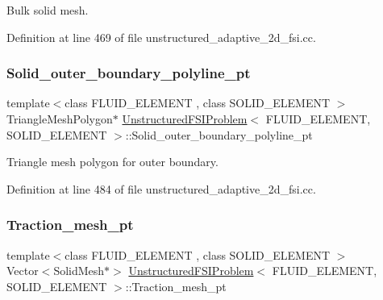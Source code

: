 Bulk solid mesh. 



Definition at line 469 of file unstructured\+\_\+adaptive\+\_\+2d\+\_\+fsi.\+cc.

\mbox{\label{classUnstructuredFSIProblem_afae1de4c7e087e2ba4f60f4f7632674b}} 
\subsubsection{\texorpdfstring{Solid\+\_\+outer\+\_\+boundary\+\_\+polyline\+\_\+pt}{Solid\_outer\_boundary\_polyline\_pt}}
{\footnotesize\ttfamily template$<$class F\+L\+U\+I\+D\+\_\+\+E\+L\+E\+M\+E\+NT , class S\+O\+L\+I\+D\+\_\+\+E\+L\+E\+M\+E\+NT $>$ \\
Triangle\+Mesh\+Polygon$\ast$ \hyperlink{classUnstructuredFSIProblem}{Unstructured\+F\+S\+I\+Problem}$<$ F\+L\+U\+I\+D\+\_\+\+E\+L\+E\+M\+E\+NT, S\+O\+L\+I\+D\+\_\+\+E\+L\+E\+M\+E\+NT $>$\+::Solid\+\_\+outer\+\_\+boundary\+\_\+polyline\+\_\+pt\hspace{0.3cm}{\ttfamily [private]}}



Triangle mesh polygon for outer boundary. 



Definition at line 484 of file unstructured\+\_\+adaptive\+\_\+2d\+\_\+fsi.\+cc.

\mbox{\label{classUnstructuredFSIProblem_ab722df0380d0c045f093472173340fa1}} 
\subsubsection{\texorpdfstring{Traction\+\_\+mesh\+\_\+pt}{Traction\_mesh\_pt}}
{\footnotesize\ttfamily template$<$class F\+L\+U\+I\+D\+\_\+\+E\+L\+E\+M\+E\+NT , class S\+O\+L\+I\+D\+\_\+\+E\+L\+E\+M\+E\+NT $>$ \\
Vector$<$Solid\+Mesh$\ast$$>$ \hyperlink{classUnstructuredFSIProblem}{Unstructured\+F\+S\+I\+Problem}$<$ F\+L\+U\+I\+D\+\_\+\+E\+L\+E\+M\+E\+NT, S\+O\+L\+I\+D\+\_\+\+E\+L\+E\+M\+E\+NT $>$\+::Traction\+\_\+mesh\+\_\+pt\hspace{0.3cm}{\ttfamily [private]}}



